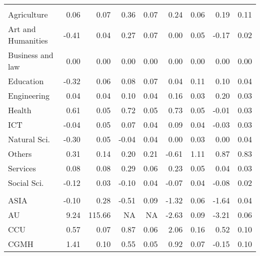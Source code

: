\begin{longtable}[t]{lrrrrrrrr}
\endfoot
\bottomrule
\endlastfoot
\addlinespace[0.3em]
\multicolumn{9}{l}{\textit{\textbf{Panel A: }}}\\
\hspace{1em}Agriculture & 0.06 & 0.07 & 0.36 & 0.07 & 0.24 & 0.06 & 0.19 & 0.11\\
\hspace{1em}Art and Humanities & -0.41 & 0.04 & 0.27 & 0.07 & 0.00 & 0.05 & -0.17 & 0.02\\
\hspace{1em}Business and law & 0.00 & 0.00 & 0.00 & 0.00 & 0.00 & 0.00 & 0.00 & 0.00\\
\hspace{1em}Education & -0.32 & 0.06 & 0.08 & 0.07 & 0.04 & 0.11 & 0.10 & 0.04\\
\hspace{1em}Engineering & 0.04 & 0.04 & 0.10 & 0.04 & 0.16 & 0.03 & 0.20 & 0.03\\
\hspace{1em}Health & 0.61 & 0.05 & 0.72 & 0.05 & 0.73 & 0.05 & -0.01 & 0.03\\
\hspace{1em}ICT & -0.04 & 0.05 & 0.07 & 0.04 & 0.09 & 0.04 & -0.03 & 0.03\\
\hspace{1em}Natural Sci. & -0.30 & 0.05 & -0.04 & 0.04 & 0.00 & 0.03 & 0.00 & 0.04\\
\hspace{1em}Others & 0.31 & 0.14 & 0.20 & 0.21 & -0.61 & 1.11 & 0.87 & 0.83\\
\hspace{1em}Services & 0.08 & 0.08 & 0.29 & 0.06 & 0.23 & 0.05 & 0.04 & 0.03\\
\hspace{1em}Social Sci. & -0.12 & 0.03 & -0.10 & 0.04 & -0.07 & 0.04 & -0.08 & 0.02\\
\addlinespace[0.3em]
\multicolumn{9}{l}{\textit{\textbf{Panel B: }}}\\
\hspace{1em}ASIA & -0.10 & 0.28 & -0.51 & 0.09 & -1.32 & 0.06 & -1.64 & 0.04\\
\hspace{1em}AU & 9.24 & 115.66 & NA & NA & -2.63 & 0.09 & -3.21 & 0.06\\
\hspace{1em}CCU & 0.57 & 0.07 & 0.87 & 0.06 & 2.06 & 0.16 & 0.52 & 0.10\\
\hspace{1em}CGMH & 1.41 & 0.10 & 0.55 & 0.05 & 0.92 & 0.07 & -0.15 & 0.10\\

\end{longtable}
